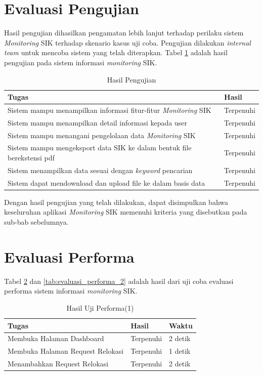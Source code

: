 \section{Evaluasi Pengujian}
\tab Hasil pengujian dihasilkan pengamatan lebih lanjut terhadap perilaku sistem \textit{Monitoring} SIK terhadap skenario kasus uji coba. Pengujian dilakukan \textit{internal team} untuk mencoba sistem yang telah diterapkan. Tabel \ref{tab:hasil_pengujian} adalah hasil pengujian pada sistem informasi \textit{monitoring} SIK.
\begin{table}[h!]
	\centering
	\begin{tabular}{|p{6cm}|p{4cm}|}
	\hline
	\textbf{Tugas} & \textbf{Hasil}\\ \hline
	Sistem mampu menampilkan informasi fitur-fitur \textit{Monitoring} SIK & Terpenuhi\\ \hline
	Sistem mampu menampilkan detail informasi kepada user & Terpenuhi\\ \hline
	Sistem mampu menangani pengelolaan data \textit{Monitoring} SIK & Terpenuhi\\ \hline
	Sistem mampu mengeksport data SIK ke dalam bentuk file berekstensi pdf & Terpenuhi\\ \hline
	Sistem menampilkan data sesuai dengan \textit{keyword} pencarian & Terpenuhi\\ \hline
	Sistem dapat mendownload dan upload file ke dalam basis data & Terpenuhi\\ \hline
	\end{tabular}\caption{Hasil Pengujian}
		\label{tab:hasil_pengujian}
\end{table}

Dengan hasil pengujian yang telah dilakukan, dapat disimpulkan bahwa keseluruhan aplikasi \textit{Monitoring} SIK memenuhi kriteria yang disebutkan pada sub-bab sebelumnya.

\section{Evaluasi Performa}
Tabel \ref{tab:evaluasi_performa_1} dan \ref{tab:evaluasi_performa_2} adalah hasil dari uji coba evaluasi performa sistem informasi \textit{monitoring} SIK.
\begin{table}
\centering
\begin{tabular}{|p{5cm}|p{2.5cm}|p{2cm}|}
\hline
\textbf{Tugas} & \textbf{Hasil} & \textbf{Waktu}\\ \hline
Membuka Halaman Dashboard & Terpenuhi & 2 detik\\ \hline
Membuka Halaman Request Relokasi & Terpenuhi & 1 detik\\ \hline
Menambahkan Request Relokasi & Terpenuhi & 2 detik\\ \hline
\end{tabular}\caption{Hasil Uji Performa(1)}
		\label{tab:evaluasi_performa_1}
\end{table}

